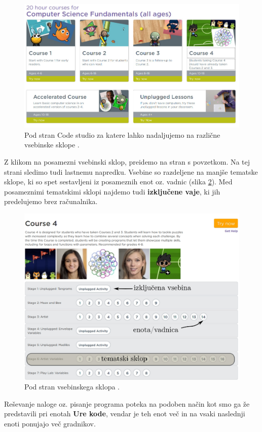 \begin{figure}[h!]
  \centering
  \includegraphics [width=0.65\linewidth, keepaspectratio =
  1] {./images/sc_web/code_cs_main_v01.jpg}
  \caption{Pod stran Code studio za katere lahko nadaljujemo na
    različne vsebinske sklope \cite{web:code.org:studio}.}
  \label{fig:scr:web:codestudio:main}
\end{figure}

Z klikom na posamezni vsebinski sklop, preidemo na stran s
povzetkom. Na tej strani sledimo tudi lastnemu napredku. Vsebine so
razdeljene na manjše tematske sklope, ki so spet sestavljeni iz
posameznih enot oz. vadnic (slika
\ref{fig:scr:web:codestudio:course}). Med posameznimi tematskimi
sklopi najdemo tudi \textbf{izključene vaje}, ki jih predelujemo brez
računalnika.

\begin{figure}[h!]
  \centering
  \includegraphics [width=0.65\linewidth, keepaspectratio =
  1] {./images/sc_web/code_course.jpg}
  \caption{Pod stran vsebinskega sklopa \cite{web:code.org:studio}.}
  \label{fig:scr:web:codestudio:course}
\end{figure}
  
Reševanje naloge oz. pisanje programa poteka na podoben način kot smo
ga že predstavili pri enotah \textbf{Ure kode}, vendar je teh enot več
in na vsaki naslednji enoti ponujajo več gradnikov.

